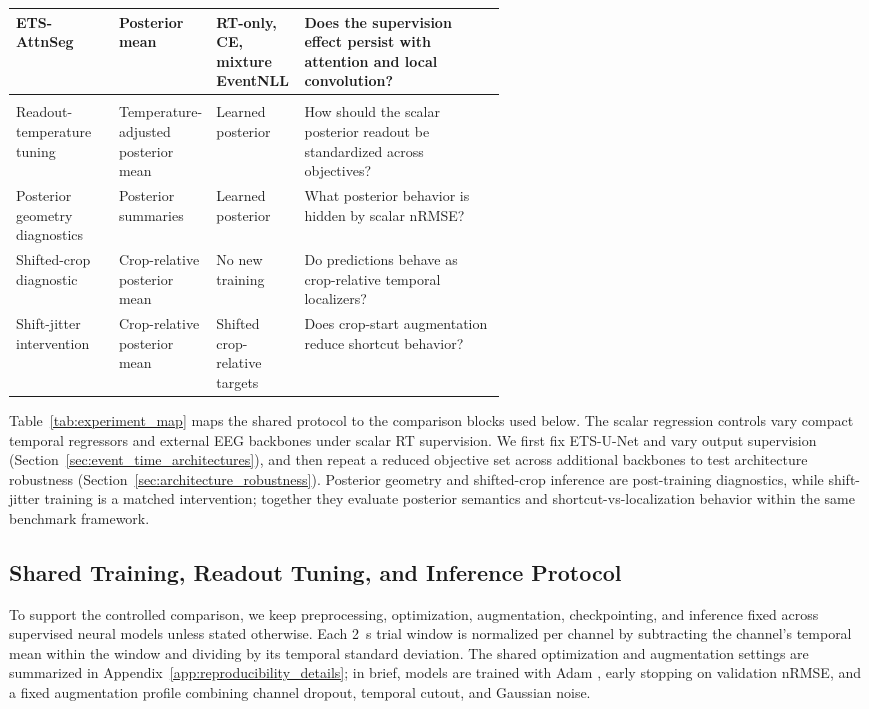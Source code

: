 \documentclass[12pt]{article}
\begin{document}
\begin{table}[!t]
\begin{tabularx}{\linewidth}{@{} >{\RaggedRight\arraybackslash}p{0.21\linewidth} >{\RaggedRight\arraybackslash}p{0.18\linewidth} >{\RaggedRight\arraybackslash}p{0.18\linewidth} >{\RaggedRight\arraybackslash}X @{}}
ETS-AttnSeg & Posterior mean & RT-only, CE, mixture EventNLL & Does the supervision effect persist with attention and local convolution? \\
\midrule
\multicolumn{4}{@{}l}{\textit{Posterior and localization diagnostics}} \\
\addlinespace[0.15em]
Readout-temperature tuning & Temperature-adjusted posterior mean & Learned posterior & How should the scalar posterior readout be standardized across objectives? \\
Posterior geometry diagnostics & Posterior summaries & Learned posterior & What posterior behavior is hidden by scalar nRMSE? \\
Shifted-crop diagnostic & Crop-relative posterior mean & No new training & Do predictions behave as crop-relative temporal localizers? \\
Shift-jitter intervention & Crop-relative posterior mean & Shifted crop-relative targets & Does crop-start augmentation reduce shortcut behavior? \\
\bottomrule
\end{tabularx}
\end{table}

Table~\ref{tab:experiment_map} maps the shared protocol to the comparison blocks used below. The scalar regression controls vary compact temporal regressors and external EEG backbones under scalar RT supervision. We first fix ETS-U-Net and vary output supervision (Section~\ref{sec:event_time_architectures}), and then repeat a reduced objective set across additional backbones to test architecture robustness (Section~\ref{sec:architecture_robustness}). Posterior geometry and shifted-crop inference are post-training diagnostics, while shift-jitter training is a matched intervention; together they evaluate posterior semantics and shortcut-vs-localization behavior within the same benchmark framework.

\subsection{Shared Training, Readout Tuning, and Inference Protocol}
\label{sec:shared_protocol}

To support the controlled comparison, we keep preprocessing, optimization, augmentation, checkpointing, and inference fixed across supervised neural models unless stated otherwise. Each 2~s trial window is normalized per channel by subtracting the channel's temporal mean within the window and dividing by its temporal standard deviation. The shared optimization and augmentation settings are summarized in Appendix~\ref{app:reproducibility_details}; in brief, models are trained with Adam \citep{kingma2015adam}, early stopping on validation nRMSE, and a fixed augmentation profile combining channel dropout, temporal cutout, and Gaussian noise.
\end{document}
